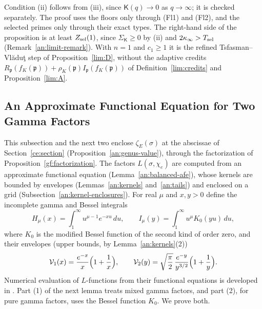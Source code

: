 \begin{remark}\label{an:signed-remark}
Condition (ii) follows from (iii), since $\mathsf K(q)\to0$ as
$q\to\infty$; it is checked separately. The proof uses the floors only
through (Fl1) and (Fl2), and the selected primes only through their exact
types. The right-hand side of the proposition is at least
$Z_{\rm sel}(1)$, since $\Sigma_{\mathsf K}\ge0$ by (ii) and
$2\kappa_\infty>T_{\rm sel}$ (Remark~\ref{an:limit-remark}). With $n=1$ and
$c_1\ge1$ it is the refined Tsfasman--Vl\u{a}du\c{t} step of
Proposition~\ref{lim:D}, without the adaptive credits
$R_{\mathfrak p}(f_K(\mathfrak p))+\rho_K(\mathfrak p)I_{\mathfrak p}(f_K(\mathfrak p))$
of Definition~\ref{lim:credits} and Proposition~\ref{lim:A}.
\end{remark}

\subsection{An Approximate Functional Equation for Two Gamma Factors}
\label{an:afe-section}
This subsection and the next two enclose $\zeta_E(\sigma)$ at the abscissae
of Section~\ref{ce:section} (Proposition~\ref{an:genus-value}), through the
factorization of Proposition~\ref{gf:factorization}. The factors
$L(\sigma,\chi_e)$ are computed from an approximate functional equation
(Lemma~\ref{an:balanced-afe}), whose kernels are bounded by envelopes
(Lemmas~\ref{an:kernels} and~\ref{an:tails}) and enclosed on a grid
(Subsection~\ref{an:kernel-enclosures}). For real $\mu$ and $x,y>0$ define
the incomplete gamma and Bessel integrals
\[
 H_\mu(x)=\int_1^\infty u^{\mu-1}e^{-xu}\,du,\qquad
 I_\mu(y)=\int_1^\infty u^\mu K_0(yu)\,du,
\]
where $K_0$ is the modified Bessel function of the second kind of order
zero, and their envelopes (upper bounds, by Lemma~\ref{an:kernels}(2))
\[
 \mathcal V_1(x)=\frac{e^{-x}}x\Bigl(1+\frac1x\Bigr),\qquad
 \mathcal V_2(y)=\sqrt{\frac\pi2}\,\frac{e^{-y}}{y^{3/2}}\Bigl(1+\frac1y\Bigr).
\]
Numerical evaluation of $L$-functions from their functional equations is
developed in \cite{Dokchitser2004}. Part (1) of the next lemma treats mixed
gamma factors, and part (2), for pure gamma factors, uses the Bessel
function $K_0$. We prove both.

